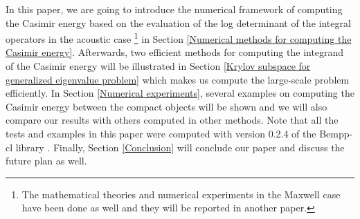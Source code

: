 In this paper, we are going to introduce the numerical framework of computing the Casimir energy based on the evaluation of the log determinant of the integral 
operators in the acoustic case \footnote{The mathematical theories and numerical experiments in the Maxwell case have been done as well and they will be 
reported in another paper.} in Section \ref{Numerical methods for computing the Casimir energy}. Afterwards,
two efficient methods for computing the integrand of the Casimir energy will be illustrated in Section \ref{Krylov subspace for generalized eigenvalue problem}
which makes us compute the large-scale problem efficiently. In Section \ref{Numerical experiments}, several examples on computing the Casimir energy between 
the compact objects will be shown and we will also compare our results with others computed in other methods. Note that all the tests and examples in this paper were computed 
with version 0.2.4 of the Bempp-cl library \cite{scroggs2017software}. Finally, Section \ref{Conclusion} will conclude 
our paper and discuss the future plan as well.

